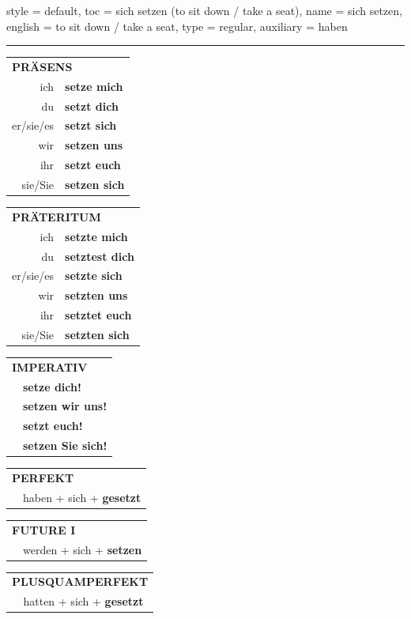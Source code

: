 \begin{verbentry}{
  style = {default},
  toc = {sich setzen (to sit down / take a seat)},
  name = {sich setzen},
  english = {to sit down / take a seat},
  type = {regular},
  auxiliary = {haben}
}


\vspace{5pt}
\hrule
\vspace{5pt}

\begin{tabular}{rl}
\multicolumn{2}{l}{\textbf{PRÄSENS}}\\
ich & \textbf{setze mich}\\
du & \textbf{setzt dich}\\
er/sie/es & \textbf{setzt sich}\\
wir & \textbf{setzen uns}\\
ihr & \textbf{setzt euch}\\
sie/Sie & \textbf{setzen sich}\\
\end{tabular}
\hfill
\begin{tabular}{rl}
\multicolumn{2}{l}{\textbf{PRÄTERITUM}}\\
ich & \textbf{setzte mich}\\
du & \textbf{setztest dich}\\
er/sie/es & \textbf{setzte sich}\\
wir & \textbf{setzten uns}\\
ihr & \textbf{setztet euch}\\
sie/Sie & \textbf{setzten sich}\\
\end{tabular}
\hfill
\begin{tabular}{rl}
\multicolumn{2}{l}{\textbf{IMPERATIV}}\\
& \textbf{setze dich!}\\
& \textbf{setzen wir uns!}\\
& \textbf{setzt euch!}\\
& \textbf{setzen Sie sich!}\\
\end{tabular}

\vspace{10pt}

\begin{tabular}{rl}
\multicolumn{2}{l}{\textbf{PERFEKT}}\\
& haben + sich + \textbf{gesetzt}\\
\end{tabular}
\hfill
\begin{tabular}{rl}
\multicolumn{2}{l}{\textbf{FUTURE I}}\\
& werden + sich + \textbf{setzen}\\
\end{tabular}
\hfill
\begin{tabular}{rl}
\multicolumn{2}{l}{\textbf{PLUSQUAMPERFEKT}}\\
& hatten + sich + \textbf{gesetzt}\\
\end{tabular}


\end{verbentry}
